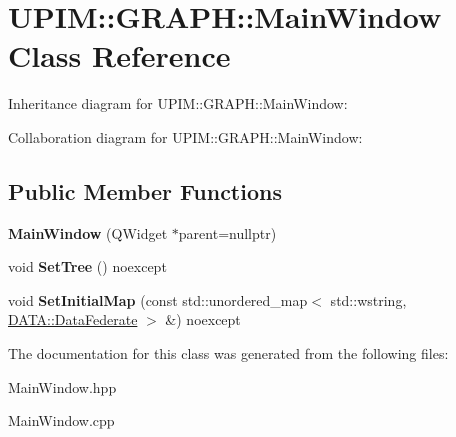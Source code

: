 \hypertarget{classUPIM_1_1GRAPH_1_1MainWindow}{}\section{U\+P\+IM\+:\+:G\+R\+A\+PH\+:\+:Main\+Window Class Reference}
\label{classUPIM_1_1GRAPH_1_1MainWindow}


Inheritance diagram for U\+P\+IM\+:\+:G\+R\+A\+PH\+:\+:Main\+Window\+:


Collaboration diagram for U\+P\+IM\+:\+:G\+R\+A\+PH\+:\+:Main\+Window\+:
\subsection*{Public Member Functions}
\begin{DoxyCompactItemize}
\item 
\mbox{\label{classUPIM_1_1GRAPH_1_1MainWindow_ab0cbee8ca308253674cddb64b0ca5637}} 
{\bfseries Main\+Window} (Q\+Widget $\ast$parent=nullptr)
\item 
\mbox{\label{classUPIM_1_1GRAPH_1_1MainWindow_a2a0b82eb3bf2c2bd798f2b5e27d0572f}} 
void {\bfseries Set\+Tree} () noexcept
\item 
\mbox{\label{classUPIM_1_1GRAPH_1_1MainWindow_a2acdd47e6a4413185f5aeed9079033ba}} 
void {\bfseries Set\+Initial\+Map} (const std\+::unordered\+\_\+map$<$ std\+::wstring, \hyperlink{classUPIM_1_1DATA_1_1DataFederate}{D\+A\+T\+A\+::\+Data\+Federate} $>$ \&) noexcept
\end{DoxyCompactItemize}


The documentation for this class was generated from the following files\+:\begin{DoxyCompactItemize}
\item 
Main\+Window.\+hpp\item 
Main\+Window.\+cpp\end{DoxyCompactItemize}
